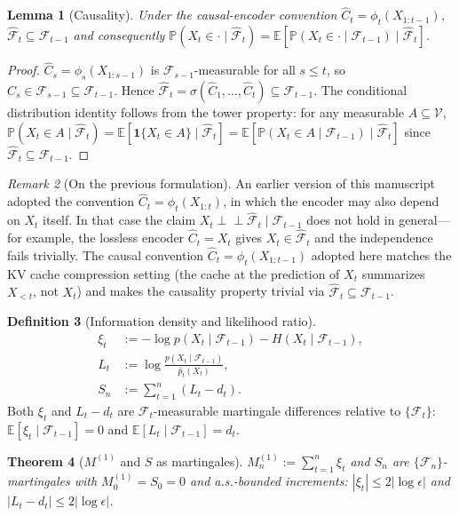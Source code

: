 \documentclass[11pt]{article}
\newcommand{\V}{\mathcal{V}}
\newcommand{\E}{\mathbb{E}}
\newcommand{\Prob}{\mathbb{P}}
\newcommand{\F}{\mathcal{F}}
\newcommand{\Fhat}{\hat{\F}}
\newcommand{\Chat}{\hat{C}}
\newcommand{\phat}{\hat{p}}
\theoremstyle{plain}
\newtheorem{theorem}{Theorem}[section]
\newtheorem{lemma}[theorem]{Lemma}
\theoremstyle{definition}
\newtheorem{definition}[theorem]{Definition}
\theoremstyle{remark}
\newtheorem{remark}[theorem]{Remark}
\begin{document}
\begin{lemma}[Causality]\label{lem:causality-app}
Under the causal-encoder convention $\Chat_t = \phi_t(X_{1:t-1})$,
$\Fhat_t \subseteq \F_{t-1}$ and consequently
$\Prob(X_t \in \cdot \mid \Fhat_t) = \E[\Prob(X_t \in \cdot \mid \F_{t-1}) \mid \Fhat_t]$.
\end{lemma}

\begin{proof}
$\Chat_s = \phi_s(X_{1:s-1})$ is $\F_{s-1}$-measurable for all
$s \leq t$, so $\Chat_s \in \F_{s-1} \subseteq \F_{t-1}$. Hence
$\Fhat_t = \sigma(\Chat_1, \ldots, \Chat_t) \subseteq \F_{t-1}$.
The conditional distribution identity follows from the tower
property: for any measurable $A \subseteq \V$,
$\Prob(X_t \in A \mid \Fhat_t) = \E[\mathbf{1}\{X_t \in A\} \mid
\Fhat_t] = \E[\Prob(X_t \in A \mid \F_{t-1}) \mid \Fhat_t]$
since $\Fhat_t \subseteq \F_{t-1}$.
\end{proof}

\begin{remark}[On the previous formulation]
An earlier version of this manuscript adopted the convention
$\Chat_t = \phi_t(X_{1:t})$, in which the encoder may also depend on
$X_t$ itself. In that case the claim
$X_t \perp\!\!\!\perp \Fhat_t \mid \F_{t-1}$ does not hold in
general---for example, the lossless encoder $\Chat_t = X_t$ gives
$X_t \in \Fhat_t$ and the independence fails trivially. The causal
convention $\Chat_t = \phi_t(X_{1:t-1})$ adopted here matches the KV
cache compression setting (the cache at the prediction of $X_t$
summarizes $X_{<t}$, not $X_t$) and makes the causality property
trivial via $\Fhat_t \subseteq \F_{t-1}$.
\end{remark}

\begin{definition}[Information density and likelihood ratio]
\label{def:martingales-app}
\begin{align*}
\xi_t &:= -\log p(X_t \mid \F_{t-1}) - H(X_t \mid \F_{t-1}), \\
L_t &:= \log \frac{p(X_t \mid \F_{t-1})}{\phat_t(X_t)}, \\
S_n &:= \sum_{t=1}^n (L_t - d_t).
\end{align*}
Both $\xi_t$ and $L_t - d_t$ are $\F_t$-measurable martingale
differences relative to $\{\F_t\}$:
$\E[\xi_t \mid \F_{t-1}] = 0$ and $\E[L_t \mid \F_{t-1}] = d_t$.
\end{definition}

\begin{theorem}[$M^{(1)}$ and $S$ as martingales]\label{thm:M1S-app}
$M_n^{(1)} := \sum_{t=1}^n \xi_t$ and $S_n$ are $\{\F_n\}$-martingales
with $M_0^{(1)} = S_0 = 0$ and a.s.-bounded increments:
$|\xi_t| \leq 2|\log\epsilon|$ and $|L_t - d_t| \leq 2|\log\epsilon|$.
\end{theorem}
\end{document}
